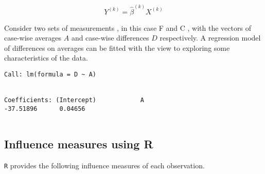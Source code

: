 \documentclass[12pt, a4paper]{report}
\begin{document}
\begin{equation}
Y^{(k)} = \hat{\beta}^{(k)}X^{(k)}
\end{equation}


Consider two sets of measurements , in this case F and C , with the vectors of case-wise averages $A$ and case-wise differences $D$ respectively. A regression model of differences on averages can be fitted with the view to exploring some characteristics of the data.


\begin{verbatim}
Call: lm(formula = D ~ A)


Coefficients: (Intercept)            A
-37.51896      0.04656


\end{verbatim}








%
%


\subsection{Influence measures using R} %
\texttt{R} provides the following influence measures of each observation.


\end{document}

